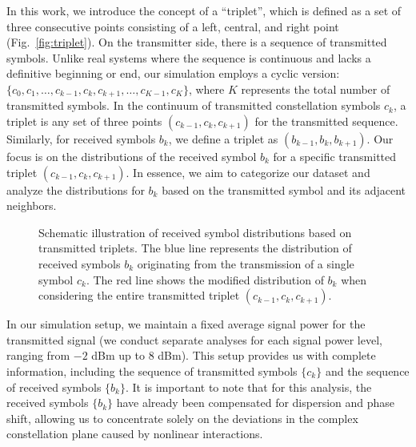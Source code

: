 In this work, we introduce the concept of a ``triplet'', which is defined as a set of three consecutive points consisting of a left, central, and right point (Fig.~\ref{fig:triplet}). On the transmitter side, there is a sequence of transmitted symbols. Unlike real systems where the sequence is continuous and lacks a definitive beginning or end, our simulation employs a cyclic version: \(\{c_0, c_1, \ldots, c_{k-1}, c_k, c_{k+1}, \ldots, c_{K-1}, c_{K}\}\), where \(K\) represents the total number of transmitted symbols. In the continuum of transmitted constellation symbols \(c_k\), a triplet is any set of three points \((c_{k-1}, c_k, c_{k+1})\) for the transmitted sequence. Similarly, for received symbols \(b_k\), we define a triplet as \((b_{k-1}, b_k, b_{k+1})\). Our focus is on the distributions of the received symbol \(b_k\) for a specific transmitted triplet \((c_{k-1}, c_k, c_{k+1})\). In essence, we aim to categorize our dataset and analyze the distributions for \(b_k\) based on the transmitted symbol and its adjacent neighbors.


\begin{figure}[h]
    \caption{Schematic illustration of received symbol distributions based on transmitted triplets. The blue line represents the distribution of received symbols $b_k$ originating from the transmission of a single symbol $c_k$. The red line shows the modified distribution of $b_k$ when considering the entire transmitted triplet $(c_{k-1}, c_k, c_{k+1})$.
    }
    \label{fig:triplet_distribution}
\end{figure}

In our simulation setup, we maintain a fixed average signal power for the transmitted signal (we conduct separate analyses for each signal power level, ranging from $-2$ dBm up to $8$ dBm). This setup provides us with complete information, including the sequence of transmitted symbols $\{c_k\}$ and the sequence of received symbols $\{b_k\}$. It is important to note that for this analysis, the received symbols $\{b_k\}$ have already been compensated for dispersion and phase shift, allowing us to concentrate solely on the deviations in the complex constellation plane caused by nonlinear interactions.

